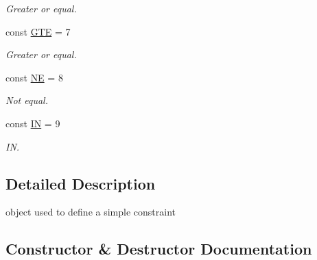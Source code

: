 \begin{DoxyCompactItemize}
\begin{DoxyCompactList}\small\item\em Greater or equal. \end{DoxyCompactList}\item 
\hypertarget{classconstraint_a7271610e95f862dfcbfeebdc22c1be05}{}const \hyperlink{classconstraint_a7271610e95f862dfcbfeebdc22c1be05}{G\+T\+E} = 7\label{classconstraint_a7271610e95f862dfcbfeebdc22c1be05}

\begin{DoxyCompactList}\small\item\em Greater or equal. \end{DoxyCompactList}\item 
\hypertarget{classconstraint_a7e396087ac8d1599de8c52809d56f601}{}const \hyperlink{classconstraint_a7e396087ac8d1599de8c52809d56f601}{N\+E} = 8\label{classconstraint_a7e396087ac8d1599de8c52809d56f601}

\begin{DoxyCompactList}\small\item\em Not equal. \end{DoxyCompactList}\item 
\hypertarget{classconstraint_afbfe29cd59c13b70e9a1a73815ae785d}{}const \hyperlink{classconstraint_afbfe29cd59c13b70e9a1a73815ae785d}{I\+N} = 9\label{classconstraint_afbfe29cd59c13b70e9a1a73815ae785d}

\begin{DoxyCompactList}\small\item\em I\+N. \end{DoxyCompactList}\end{DoxyCompactItemize}


\subsection{Detailed Description}
object used to define a simple constraint 

\subsection{Constructor \& Destructor Documentation}
\hypertarget{classconstraint_a9e4321b5cf73af8119e6ecaac6069bbc}{}
